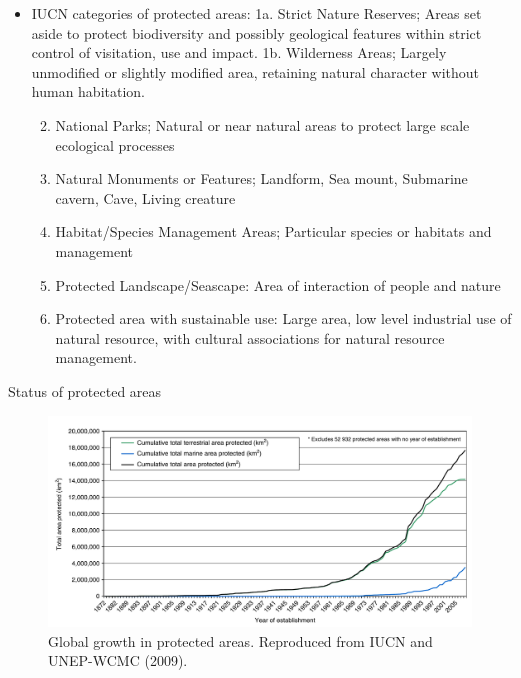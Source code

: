 \documentclass[
  ignorenonframetext,
  aspectratio=169]{beamer}
\providecommand{\tightlist}{%
  \setlength{\itemsep}{0pt}\setlength{\parskip}{0pt}}
\begin{document}
\begin{frame}{}
\protect\hypertarget{section-9}{}
\begin{itemize}
\tightlist
\item
  IUCN categories of protected areas: 1a. Strict Nature Reserves; Areas
  set aside to protect biodiversity and possibly geological features
  within strict control of visitation, use and impact. 1b. Wilderness
  Areas; Largely unmodified or slightly modified area, retaining natural
  character without human habitation.

  \begin{enumerate}
  \setcounter{enumi}{1}
  \tightlist
  \item
    National Parks; Natural or near natural areas to protect large scale
    ecological processes
  \item
    Natural Monuments or Features; Landform, Sea mount, Submarine
    cavern, Cave, Living creature
  \item
    Habitat/Species Management Areas; Particular species or habitats and
    management
  \item
    Protected Landscape/Seascape: Area of interaction of people and
    nature
  \item
    Protected area with sustainable use: Large area, low level
    industrial use of natural resource, with cultural associations for
    natural resource management.
  \end{enumerate}
\end{itemize}
\end{frame}

\begin{frame}{Status of protected areas}
\protect\hypertarget{status-of-protected-areas}{}
\begin{figure}
\includegraphics[width=0.65\linewidth]{./../images/global_protected_area} \caption{Global growth in protected areas. Reproduced from IUCN and UNEP-WCMC (2009).}\label{fig:global}
\end{figure}
\end{frame}
\end{document}
